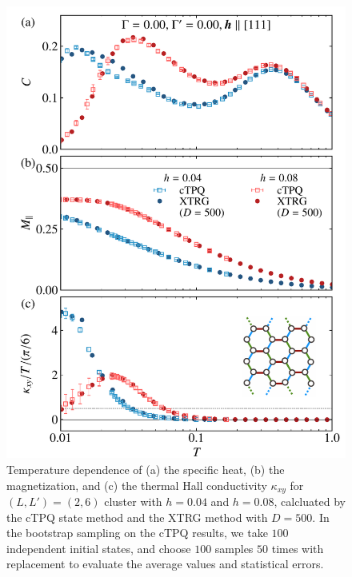 \documentclass[twocolumn,superscriptaddress,showpacs, longbibliography, aps, prx]{revtex4-2}
\begin{document}
\begin{figure}[t] 
\begin{center} 
\includegraphics[width=\linewidth]{Data_for_figs/plot/fig-21-comp-XTRG-TPQ.pdf}
\vspace{-0.5cm} 
\caption{Temperature dependence of (a) the specific heat, (b) the magnetization, and
(c) the thermal Hall conductivity $\kappa_{xy}$ for $(L, L') = (2, 6)$ cluster with $h=0.04$ and $h=0.08$, calcluated by the cTPQ state method and the XTRG method with $D=500$.
In the bootstrap sampling on the cTPQ results, we take $100$ independent initial states,
and choose $100$ samples $50$ times with replacement to evaluate
the average values and statistical errors. 
}
\label{comp_XTRG}
\end{center}
\end{figure}

\clearpage

\end{document}
